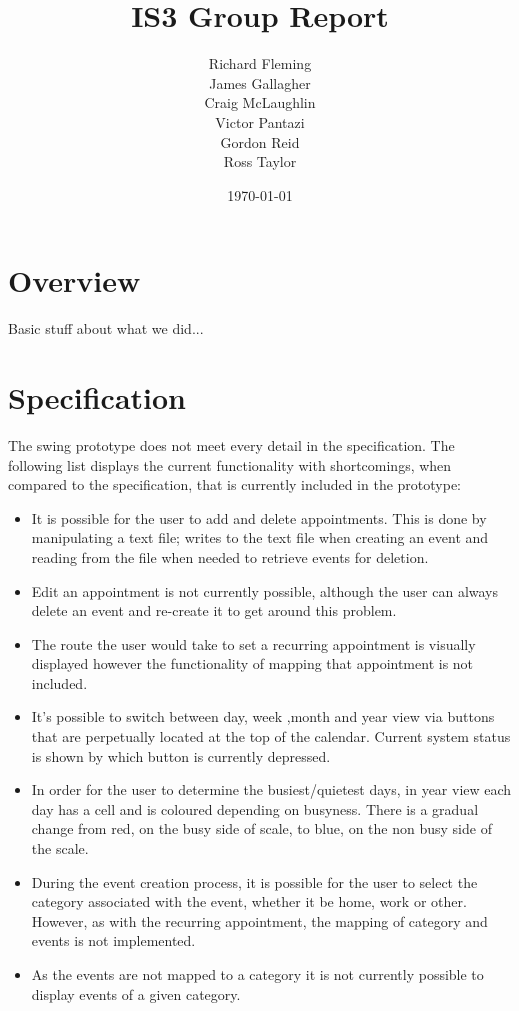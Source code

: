 \documentclass{article}
\title{IS3 Group Report}
\author{
  Richard Fleming \\
  James Gallagher \\
  Craig McLaughlin \\
  Victor Pantazi \\
  Gordon Reid \\
  Ross Taylor}
\date{\today}
\begin{document}
\maketitle

\section{Overview}

Basic stuff about what we did...

\section{Specification}
The swing prototype does not meet every detail in the specification.
        The following list displays the current functionality with shortcomings,
        when compared to the specification, that is currently included in the
        prototype:
        \begin{itemize}
       
        \item It is possible for the user to add and delete appointments. This is
        done by manipulating a text file; writes to the text file when creating an
         event and reading from the file when needed to retrieve events for deletion.
        \item Edit an appointment is not currently possible, although the user can
        always delete an event and re-create it to get around this problem.
        \item The route the user would take to set a recurring appointment is
        visually displayed however the functionality of mapping that appointment
        is not included.
        \item It's possible to switch between day, week ,month and year view
        via buttons that are perpetually located at the top of the calendar. Current
        system status is shown by which button is currently depressed.
        \item In order for the user to determine the busiest/quietest days, in year
        view each day has a cell and is coloured depending on busyness. There is a
        gradual change from red, on the busy side of scale, to blue, on the non busy
        side of the scale.
        \item  During the event creation process, it is possible for the user to
        select the category associated with the event, whether it be home, work or
        other. However, as with the recurring appointment, the mapping of category
        and events is not implemented.
        \item As the events are not mapped to a category it is not currently
        possible to display events of a given category.

        \end{itemize}
\end{document}
